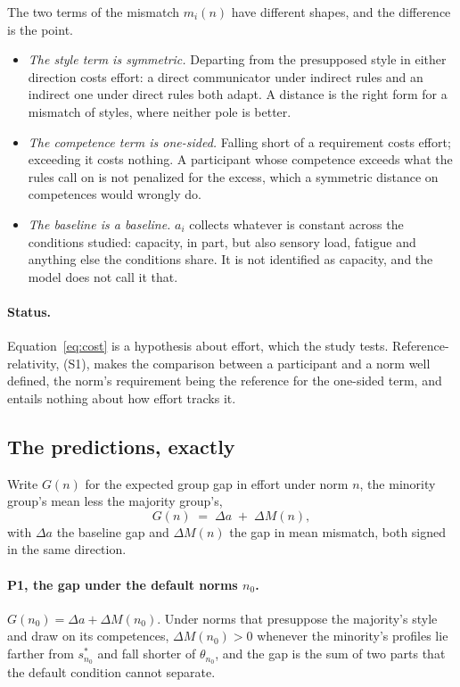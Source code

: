 \noindent The two terms of the mismatch $m_i(n)$ have different shapes, and the difference is the point.
\begin{itemize}[leftmargin=*]
\item \emph{The style term is symmetric.} Departing from the presupposed style in either direction costs effort: a direct communicator under indirect rules and an indirect one under direct rules both adapt. A distance is the right form for a mismatch of styles, where neither pole is better.
\item \emph{The competence term is one-sided.} Falling short of a requirement costs effort; exceeding it costs nothing. A participant whose competence exceeds what the rules call on is not penalized for the excess, which a symmetric distance on competences would wrongly do.
\item \emph{The baseline is a baseline.} $a_i$ collects whatever is constant across the conditions studied: capacity, in part, but also sensory load, fatigue and anything else the conditions share. It is not identified as capacity, and the model does not call it that.
\end{itemize}

\paragraph{Status.} Equation~\eqref{eq:cost} is a hypothesis about effort, which the study tests. Reference-relativity, (S1), makes the comparison between a participant and a norm well defined, the norm's requirement being the reference for the one-sided term, and entails nothing about how effort tracks it.

\subsection{The predictions, exactly}
\label{sec:predictions}

Write $G(n)$ for the expected group gap in effort under norm $n$, the minority group's mean less the majority group's,
\begin{equation}
\label{eq:gap}
G(n) \;=\; \Delta a \;+\; \Delta M(n),
\end{equation}
with $\Delta a$ the baseline gap and $\Delta M(n)$ the gap in mean mismatch, both signed in the same direction.

\paragraph{P1, the gap under the default norms $n_0$.} $G(n_0) = \Delta a + \Delta M(n_0)$. Under norms that presuppose the majority's style and draw on its competences, $\Delta M(n_0) > 0$ whenever the minority's profiles lie farther from $s^{*}_{n_0}$ and fall shorter of $\theta_{n_0}$, and the gap is the sum of two parts that the default condition cannot separate.

